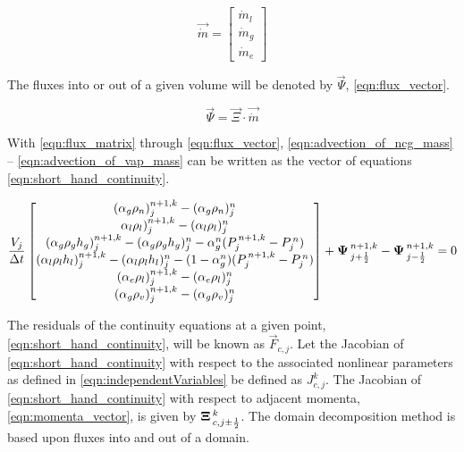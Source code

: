 \begin{equation}
\label{eqn:momenta_vector}
\vec{\dot{m}} = \begin{bmatrix}
\dot{m}_{l} \\
\dot{m}_{g} \\
\dot{m}_{e}
\end{bmatrix}
\end{equation}

The fluxes into or out of a given volume will be denoted by $\vec{\Psi}$, \eqref{eqn:flux_vector}.

\begin{equation}
\label{eqn:flux_vector}
\vec{\Psi} = \vec{\Xi} \cdot \vec{\dot{m}}
\end{equation}

With \eqref{eqn:flux_matrix} through \eqref{eqn:flux_vector}, \eqref{eqn:advection_of_ncg_mass} -- \eqref{eqn:advection_of_vap_mass} can be written as the vector of equations \eqref{eqn:short_hand_continuity}.

\begin{equation}
\label{eqn:short_hand_continuity}
\frac{V_j}{\dt} \begin{bmatrix}
(\alpha_{g} \rho_{n})^{n+1, k}_{j} - (\alpha_{g} \rho_{n})^{n}_{j} \\
\alpha_{l} \rho_{l})^{n+1, k}_{j} - (\alpha_{l} \rho_{l})^{n}_{j} \\
(\alpha_{g} \rho_{g} h_{g})^{n+1, k}_{j} - (\alpha_{g} \rho_g h_{g})^{n}_{j} - \alpha^{n}_{g} ( P^{\, n+1, k}_{j} - P^{\,n}_{j} )  \\
(\alpha_{l} \rho_{l} h_{l})^{n+1, k}_{j} - (\alpha_{l} \rho_{l} h_{l} )^{n}_{j} - (1 - \alpha^{n}_{g}) ( P^{\, n+1, k}_{j} - P^{\,n}_{j} )\\
(\alpha_{e} \rho_{l})^{n+1, k}_{j} - (\alpha_{e} \rho_{l})^{n}_{j} \\
(\alpha_{g} \rho_{v})^{n+1, k}_{j} - (\alpha_{g} \rho_{v})^{n}_{j} 
\end{bmatrix} + \vec{\Psi}^{n+1, k}_{j + \onehalf} - \vec{\Psi}^{n+1, k}_{j - \onehalf}= 0
\end{equation}

The residuals of the continuity equations at a given point, \eqref{eqn:short_hand_continuity}, will be known as $\vec{F}_{c, j}$.
Let the Jacobian of \eqref{eqn:short_hand_continuity} with respect to the associated nonlinear parameters as defined in \eqref{eqn:independentVariables} be defined as $J^{k}_{c, j}$.
The Jacobian of \eqref{eqn:short_hand_continuity} with respect to adjacent momenta, \eqref{eqn:momenta_vector}, is given by $\vec{\Xi}^{k}_{c, j \pm \onehalf}$.
The domain decomposition method is based upon fluxes into and out of a domain.

